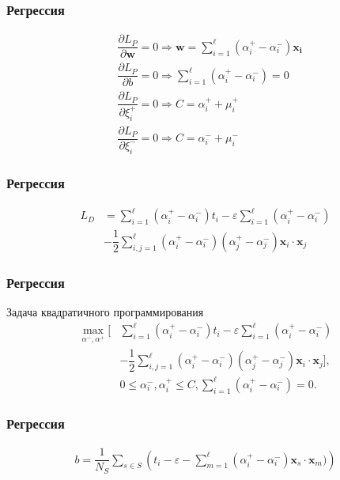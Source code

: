 \documentclass[14pt]{beamer}
\begin{document}
\begin{frame}
\frametitle{Регрессия}
\begin{align*}
  &\dfrac{\partial L_P}{\partial \mathbf{w}} = 0 \Rightarrow
  \mathbf{w} = \sum\limits_{i = 1}^{\ell}(\alpha_i^+ - \alpha_i^-)\mathbf{x_i}\\
  &\dfrac{\partial L_P}{\partial b} = 0 \Rightarrow
  \sum\limits_{i = 1}^{\ell}(\alpha_i^+ - \alpha_i^-) = 0\\
  &\dfrac{\partial L_P}{\partial \xi_i^+} = 0 \Rightarrow
  C = \alpha_i^+ + \mu_i^+\\
  &\dfrac{\partial L_P}{\partial \xi_i^-} = 0 \Rightarrow
  C = \alpha_i^- + \mu_i^-
\end{align*}
\end{frame}

\begin{frame}
\frametitle{Регрессия}
\begin{align*}
  L_D &= \sum\limits_{i = 1}^{\ell}(\alpha_i^+ - \alpha_i^-)t_i
   -\varepsilon \sum\limits_{i = 1}^{\ell}(\alpha_i^+ - \alpha_i^-)\\
  &- \dfrac{1}{2}\sum\limits_{i, j = 1}^{\ell}(\alpha_i^+ - \alpha_i^-)(\alpha_j^+ - \alpha_j^-)\mathbf{x}_i \cdot \mathbf{x}_j
\end{align*}
\end{frame}

\begin{frame}
\frametitle{Регрессия}
Задача квадратичного программирования
\begin{align*}
   \underset{\alpha^-, \alpha^+}{\max}\biggl[&\sum\limits_{i = 1}^{\ell}(\alpha_i^+ - \alpha_i^-)t_i
   -\varepsilon \sum\limits_{i = 1}^{\ell}(\alpha_i^+ - \alpha_i^-)\\
   &- \dfrac{1}{2}\sum\limits_{i, j = 1}^{\ell}(\alpha_i^+ - \alpha_i^-)(\alpha_j^+ - \alpha_j^-)\mathbf{x}_i \cdot \mathbf{x}_j\biggr],\\
   &0  \leqslant \alpha_i^-, \alpha_i^+ \leqslant C, \sum\limits_{i = 1}^{\ell}(\alpha_i^+ - \alpha_i^-) = 0.
\end{align*}
\end{frame}

\begin{frame}
\frametitle{Регрессия}
\begin{align*}
  b = \dfrac{1}{N_S}\sum\limits_{s \in S}
    \left(t_i - \varepsilon - \sum\limits_{m = 1}^{\ell}
      (\alpha_i^+ - \alpha_i^-)\mathbf{x}_s \cdot \mathbf{x}_m)\right)
\end{align*}
\end{frame}
\end{document}
